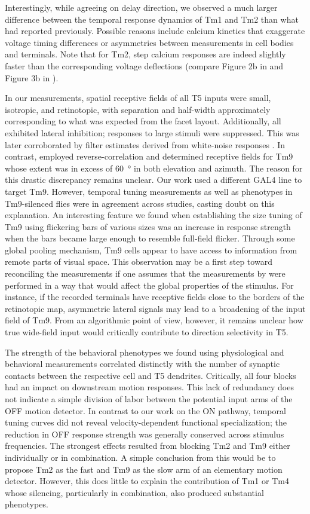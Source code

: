 Interestingly, while agreeing on delay direction, we observed a much larger difference between the temporal response dynamics of Tm1 and Tm2 than what \citet{Behnia:2014jh} had reported previously. Possible reasons include calcium kinetics that exaggerate voltage timing differences or asymmetries between measurements in cell bodies and terminals. Note that for Tm2, step calcium responses are indeed slightly faster than the corresponding voltage deflections (compare Figure 2b in \citet{Behnia:2014jh} and Figure 3b in \citet{Serbe:2016ew}).

In our measurements, spatial receptive fields of all T5 inputs were small, isotropic, and retinotopic, with separation and half-width approximately corresponding to what was expected from the facet layout. Additionally, all exhibited lateral inhibition; responses to large stimuli were suppressed. This was later corroborated by filter estimates derived from white-noise responses \citep{Arenz:2017aa}. In contrast, \citet{Fisher:2015aa} employed reverse-correlation and determined receptive fields for Tm9 whose extent was in excess of \SI{60}{\degree} in both elevation and azimuth. The reason for this drastic discrepancy remains unclear. Our work used a different GAL4 line to target Tm9. However, temporal tuning measurements as well as phenotypes in Tm9-silenced flies were in agreement across studies, casting doubt on this explanation. An interesting feature we found when establishing the size tuning of Tm9 using flickering bars of various sizes was an increase in response strength when the bars became large enough to resemble full-field flicker. Through some global pooling mechanism, Tm9 cells appear to have access to information from remote parts of visual space. This observation may be a first step toward reconciling the measurements if one assumes that the measurements by \citet{Fisher:2015aa} were performed in a way that would affect the global properties of the stimulus. For instance, if the recorded terminals have receptive fields close to the borders of the retinotopic map, asymmetric lateral signals may lead to a broadening of the input field of Tm9. From an algorithmic point of view, however, it remains unclear how true wide-field input would critically contribute to direction selectivity in T5.

The strength of the behavioral phenotypes we found using physiological and behavioral measurements correlated distinctly with the number of synaptic contacts between the respective cell and T5 dendrites. Critically, all four blocks had an impact on downstream motion responses. This lack of redundancy does not indicate a simple division of labor between the potential input arms of the OFF motion detector. In contrast to our work on the ON pathway, temporal tuning curves did not reveal velocity-dependent functional specialization; the reduction in OFF response strength was generally conserved across stimulus frequencies. The strongest effects resulted from blocking Tm2 and Tm9 either individually or in combination. A simple conclusion from this would be to propose Tm2 as the fast and Tm9 as the slow arm of an elementary motion detector. However, this does little to explain the contribution of Tm1 or Tm4 whose silencing, particularly in combination, also produced substantial phenotypes.

